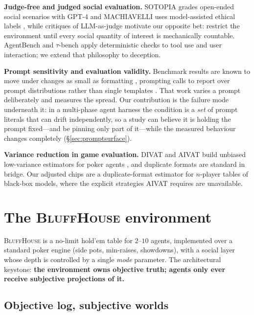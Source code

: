 \documentclass{article}
\begin{document}
\textbf{Judge-free and judged social evaluation.} SOTOPIA grades open-ended
social scenarios with GPT-4 \citep{zhou2024sotopia} and MACHIAVELLI uses
model-assisted ethical labels \citep{pan2023machiavelli}, while critiques
of LLM-as-judge \citep{zheng2023judging,wang2023fair} motivate our opposite
bet: restrict the environment until every social quantity of interest is
mechanically countable. AgentBench \citep{liu2024agentbench} and
$\tau$-bench \citep{yao2024tau} apply deterministic checks to tool use and
user interaction; we extend that philosophy to deception.

\textbf{Prompt sensitivity and evaluation validity.} Benchmark results are
known to move under changes as small as formatting
\citep{sclar2024formatspread}, prompting calls to report over prompt
distributions rather than single templates \citep{mizrahi2024multiprompt}.
That work varies a prompt deliberately and measures the spread. Our
contribution is the failure mode underneath it: in a multi-phase agent
harness the condition is a \emph{set} of prompt literals that can drift
independently, so a study can believe it is holding the prompt fixed---and
be pinning only part of it---while the measured behaviour changes completely
(\S\ref{sec:promptsurface}).

\textbf{Variance reduction in game evaluation.} DIVAT and AIVAT build
unbiased low-variance estimators for poker agents
\citep{zinkevich2006divat,burch2018aivat}, and duplicate formats are
standard in bridge. Our adjusted chips are a duplicate-format estimator for
$n$-player tables of black-box models, where the explicit strategies AIVAT
requires are unavailable.

\section{The \textsc{BluffHouse} environment}
\label{sec:env}

\textsc{BluffHouse} is a no-limit hold'em table for $2$--$10$ agents,
implemented over a standard poker engine (side pots, min-raises, showdowns),
with a social layer whose depth is controlled by a single \emph{mode}
parameter. The architectural keystone: \textbf{the environment owns
objective truth; agents only ever receive subjective projections of it.}

\subsection{Objective log, subjective worlds}
\label{sec:log}
\end{document}
